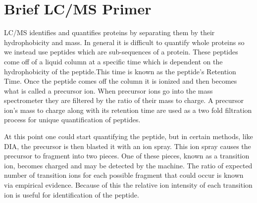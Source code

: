 \documentclass[12pt]{article}
\begin{document}
\section{Brief LC/MS Primer}
LC/MS identifies and quantifies proteins by separating them by their hydrophobicity and mass. In general it is difficult to quantify whole proteins so we instead use peptides which are sub-sequences of a protein. These peptides come off of a liquid column at a specific time which is dependent on the hydrophobicity of the peptide.This time is known as the peptide's Retention Time. Once the peptide comes off the column it is ionized and then becomes what is called a precursor ion. When precursor ions go into the mass spectrometer they are filtered by the ratio of their mass to charge. A precursor ion's mass to charge along with its retention time are used as a two fold filtration process for unique quantification of peptides. 

At this point one could start quantifying the peptide, but in certain methods, like DIA, the precursor is then blasted it with an ion spray. This ion spray causes the precursor to fragment into two pieces. One of these pieces, known as a transition ion, becomes charged and may be detected by the machine. The ratio of expected number of transition ions for each possible fragment that could occur is known via empirical evidence. Because of this the relative ion intensity of each transition ion is useful for identification of the peptide.
\end{document}
